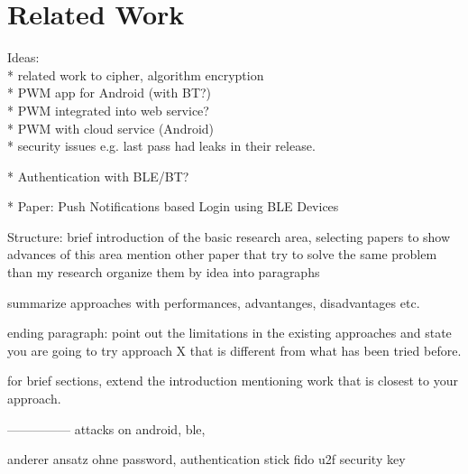 \section{Related Work}
\label{relwork}

Ideas: \\
* related work to cipher, algorithm encryption \\
* PWM app for Android (with BT?) \\
* PWM integrated into web service? \\
* PWM with cloud service (Android) \\

* security issues e.g. last pass had leaks in their release.

* Authentication with BLE/BT?

* Paper: Push Notifications based Login using BLE Devices


Structure:
brief introduction of the basic research area, selecting papers to show advances of this area
mention other paper that try to solve the same problem than my research
organize them by idea into paragraphs

summarize approaches with performances, advantanges, disadvantages etc.

ending paragraph: point out the limitations in the existing approaches and state you are going to try approach X that is different from what has been tried before.

for brief sections, extend the introduction mentioning work that is closest to your approach.



---------------
attacks on android, ble,

anderer ansatz ohne password, authentication stick 
fido u2f security key

